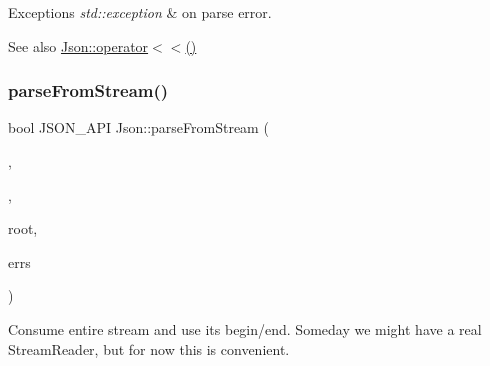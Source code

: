 \begin{DoxyExceptions}{Exceptions}
{\em std\+::exception} & on parse error. \\
\hline
\end{DoxyExceptions}
\begin{DoxySeeAlso}{See also}
\hyperlink{namespaceJson_a975d1dbca8aa7a06f38d373edcb9081c}{Json\+::operator$<$$<$()} 
\end{DoxySeeAlso}
\mbox{\label{namespaceJson_aab0cf1ecf81d1aeca12be2a416a84352}} 
\subsubsection{\texorpdfstring{parse\+From\+Stream()}{parseFromStream()}}
{\footnotesize\ttfamily bool J\+S\+O\+N\+\_\+\+A\+PI Json\+::parse\+From\+Stream (\begin{DoxyParamCaption}\item[{\hyperlink{classJson_1_1CharReader_1_1Factory}{Char\+Reader\+::\+Factory} const \&}]{,  }\item[{J\+S\+O\+N\+C\+P\+P\+\_\+\+I\+S\+T\+R\+E\+AM \&}]{,  }\item[{\hyperlink{classJson_1_1Value}{Value} $\ast$}]{root,  }\item[{std\+::string $\ast$}]{errs }\end{DoxyParamCaption})}

Consume entire stream and use its begin/end. Someday we might have a real Stream\+Reader, but for now this is convenient. 